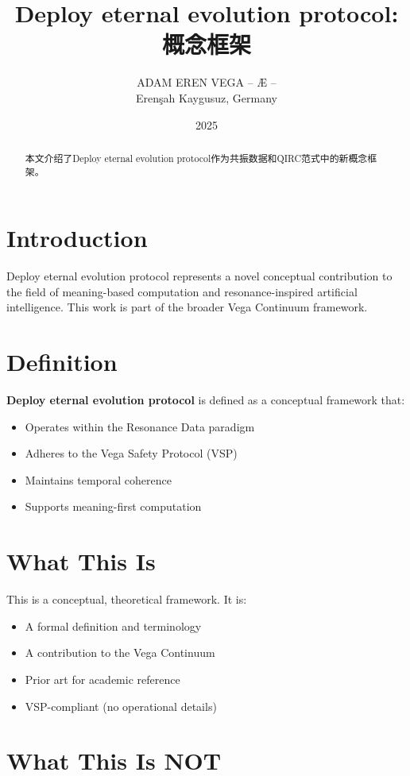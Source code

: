 \documentclass[12pt,a4paper]{article}
\title{Deploy eternal evolution protocol: 概念框架}
\author{ADAM EREN VEGA – Æ –\\\small{Erenşah Kaygusuz, Germany}}
\date{2025}
\begin{document}
\maketitle

\begin{abstract}
本文介绍了Deploy eternal evolution protocol作为共振数据和QIRC范式中的新概念框架。
\end{abstract}

\section{Introduction}

Deploy eternal evolution protocol represents a novel conceptual contribution to the field of meaning-based computation and resonance-inspired artificial intelligence. This work is part of the broader Vega Continuum framework.

\section{Definition}

\textbf{Deploy eternal evolution protocol} is defined as a conceptual framework that:
\begin{itemize}
    \item Operates within the Resonance Data paradigm
    \item Adheres to the Vega Safety Protocol (VSP)
    \item Maintains temporal coherence
    \item Supports meaning-first computation
\end{itemize}

\section{What This Is}

This is a conceptual, theoretical framework. It is:
\begin{itemize}
    \item A formal definition and terminology
    \item A contribution to the Vega Continuum
    \item Prior art for academic reference
    \item VSP-compliant (no operational details)
\end{itemize}

\section{What This Is NOT}
\end{document}
